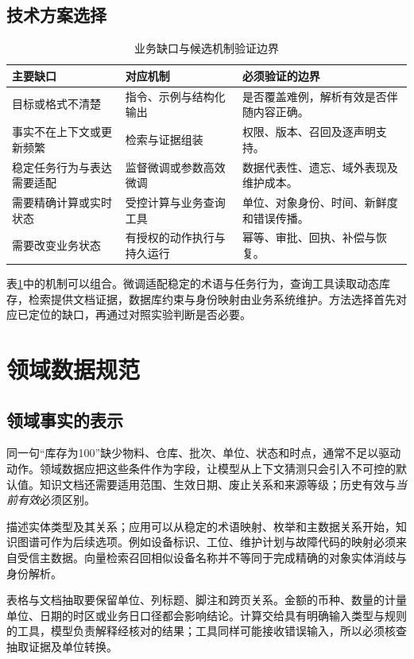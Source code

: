 \documentclass[../textbook.tex]{subfiles}
\begin{document}
\subsection{技术方案选择}
\begin{table}[htbp]
\centering
\caption{业务缺口与候选机制验证边界}
\label{tab:domain-applications-mechanisms}
\begin{tabularx}{\linewidth}{@{}p{.24\linewidth}p{.33\linewidth}X@{}}
\toprule
主要缺口 & 对应机制 & 必须验证的边界\\
\midrule
目标或格式不清楚 & 指令、示例与结构化输出 & 是否覆盖难例，解析有效是否伴随内容正确。\\
事实不在上下文或更新频繁 & 检索与证据组装 & 权限、版本、召回及逐声明支持。\\
稳定任务行为与表达需要适配 & 监督微调或参数高效微调 & 数据代表性、遗忘、域外表现及维护成本。\\
需要精确计算或实时状态 & 受控计算与业务查询工具 & 单位、对象身份、时间、新鲜度和错误传播。\\
需要改变业务状态 & 有授权的动作执行与持久运行 & 幂等、审批、回执、补偿与恢复。\\
\bottomrule
\end{tabularx}
\end{table}

表\ref{tab:domain-applications-mechanisms}中的机制可以组合。微调适配稳定的术语与任务行为，查询工具读取动态库存，检索提供文档证据，数据库约束与身份映射由业务系统维护。方法选择首先对应已定位的缺口，再通过对照实验判断是否必要。

\section{领域数据规范}

\subsection{领域事实的表示}
同一句“库存为100”缺少物料、仓库、批次、单位、状态和时点，通常不足以驱动动作。领域数据应把这些条件作为字段，让模型从上下文猜测只会引入不可控的默认值。知识文档还需要适用范围、生效日期、废止关系和来源等级；历史有效与\emph{当前有效}必须区别。

描述实体类型及其关系；应用可以从稳定的术语映射、枚举和主数据关系开始，知识图谱可作为后续选项。例如设备标识、工位、维护计划与故障代码的映射必须来自受信主数据。向量检索召回相似设备名称并不等同于完成精确的对象实体消歧与身份解析。

表格与文档抽取要保留单位、列标题、脚注和跨页关系。金额的币种、数量的计量单位、日期的时区或业务日口径都会影响结论。计算交给具有明确输入类型与规则的工具，模型负责解释经核对的结果；工具同样可能接收错误输入，所以必须核查抽取证据及单位转换。
\end{document}

